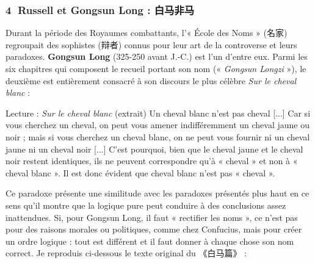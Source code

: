 \subsubsection*{\textcircled{\scriptsize 4} Russell et Gongsun Long : 白马非马}
Durant la période des Royaumes combattants, l’« École des Noms » (名家) regroupait des sophistes (辩者) connus pour leur art de la controverse et leurs paradoxes. \textbf{Gongsun Long} (325-250 avant J.-C.) est l’un d’entre eux. Parmi les six chapitres qui composent le recueil portant son nom (« \textit{Gongsun Longzi} »), le deuxième est entièrement consacré à son discours le plus célèbre \textit{Sur le cheval blanc} :

\begin{lecture}{Lecture : \textit{Sur le cheval blanc} (extrait)}
Un cheval blanc n’est pas cheval [...] Car si vous cherchez un cheval, on peut vous amener indifféremment un cheval jaune ou noir ; mais si vous cherchez un cheval blanc, on ne peut vous fournir ni un cheval jaune ni un cheval noir [...] C’est pourquoi, bien que le cheval jaune et le cheval noir restent identiques, ils ne peuvent correspondre qu’à « cheval » et non à « cheval blanc ». Il est donc évident que cheval blanc n’est pas « cheval ».
\end{lecture}

Ce paradoxe présente une similitude avec les paradoxes présentés plus haut en ce sens qu’il montre que la logique pure peut conduire à des conclusions assez inattendues. Si, pour Gongsun Long, il faut « rectifier les noms », ce n’est pas pour des raisons morales ou politiques, comme chez Confucius, mais pour créer un ordre logique : tout est différent et il faut donner à chaque chose son nom correct. Je reproduis ci-dessous le texte original du 《白马篇》 :

